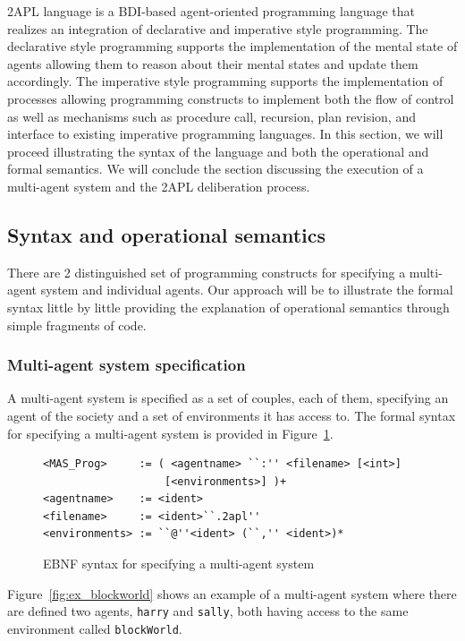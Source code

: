 \documentclass[a4paper]{article}
\begin{document}
2APL language is a BDI-based agent-oriented programming language that realizes an integration of declarative and imperative style programming. The declarative style programming supports the implementation of the mental state of agents allowing them to reason about their mental states and update them accordingly. The imperative style programming supports the implementation of  processes allowing programming constructs to implement both the flow of control as well as mechanisms such as procedure call, recursion, plan revision, and interface to existing imperative programming languages. In this section, we will proceed illustrating the syntax of the language and both the operational and formal semantics. We will conclude the section discussing the execution of a multi-agent system and the 2APL deliberation process.

\subsection{Syntax and operational semantics} %

There are 2 distinguished set of programming constructs for specifying a multi-agent system and individual agents. Our approach will be to illustrate the formal syntax little by little providing the explanation of operational semantics through simple fragments of code.

\subsubsection{Multi-agent system specification} %

A multi-agent system is specified as a set of couples, each of them, specifying an agent of the society and a set of environments it has access to. The formal syntax for specifying a multi-agent system is provided in Figure~\ref{fig:ebnf_mas}. 

\begin{figure}[htbp]
\begin{verbatim}
<MAS_Prog>     := ( <agentname> ``:'' <filename> [<int>]
                   [<environments>] )+
<agentname>    := <ident>
<filename>     := <ident>``.2apl''
<environments> := ``@''<ident> (``,'' <ident>)*
\end{verbatim}
\caption{EBNF syntax for specifying a multi-agent system}
\label{fig:ebnf_mas}
\end{figure}

Figure~\ref{fig:ex_blockworld} shows an example of a multi-agent system where there are defined two agents, \texttt{harry} and \texttt{sally}, both having access to the same environment called \texttt{blockWorld}.
\end{document}
